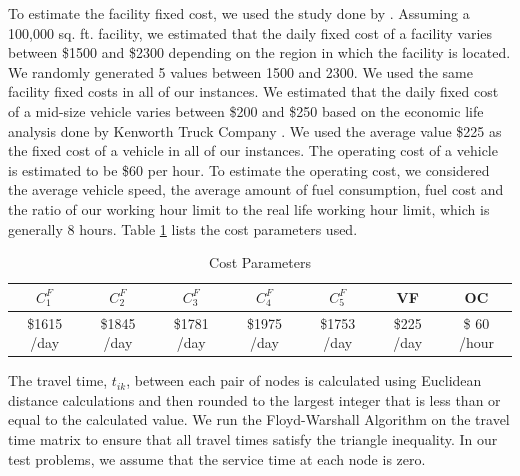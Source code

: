 To estimate the facility fixed cost, we used the study done by \citet{Burlett}. Assuming
a 100,000 sq. ft. facility, we estimated that the daily fixed cost of a facility varies 
between \$1500 and \$2300 depending on the region in which the facility is located. We 
randomly generated 5 values between 1500 and 2300. We used the same facility fixed 
costs in all of our instances. We estimated that the 
daily fixed cost of a mid-size vehicle varies between \$200 and \$250 based on the
economic life analysis done by  Kenworth Truck Company \citeyearpar{Kenworth}. We used
the average value \$225 as the fixed cost of a vehicle in all of our instances.  
The operating cost of a vehicle is estimated to be \$60 per hour. To estimate the
operating cost, we considered the average vehicle speed, the average amount of 
fuel consumption, fuel cost and the ratio of our working hour limit to the real
life working hour limit, which is generally 8 hours. Table \ref{costparam} lists 
the cost parameters used.  

\begin {table}[h]
\begin{center}
\caption {Cost Parameters} \label{costparam}
\begin {tabular}[t]{ccccccc} \hline
$C^F_1$ & $C^F_2$ & $C^F_3$ & $C^F_4$ & $C^F_5$ & VF & OC \\\hline
\$1615 /day  &	\$1845 /day  &	\$1781 /day  &	\$1975 /day  &	\$1753 /day  &   \$225 /day  & \$ 60 /hour  	 \\\hline
\end{tabular}
\end{center}
\end {table} 

The travel time, $t_{ik}$, between each pair of nodes is calculated using 
Euclidean distance calculations and then rounded to the largest integer that is less
than or equal to the calculated value.  
We run the Floyd-Warshall Algorithm \citep{Ahuja} on the travel time
matrix to ensure that all travel times satisfy the triangle inequality.
In our test problems, we assume that the service time at each
node is zero. 

